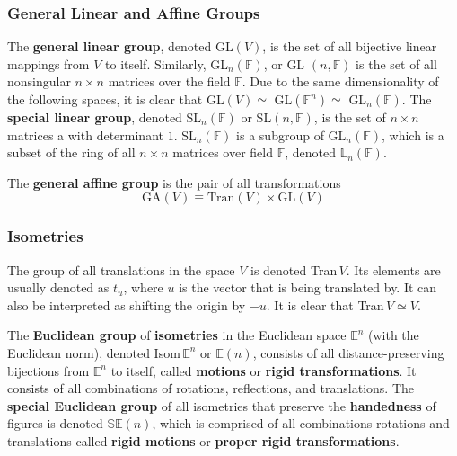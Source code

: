   \subsubsection{General Linear and Affine Groups}

    \begin{definition}
      The \textbf{general linear group}, denoted GL$(V)$, is the set of all bijective linear mappings from $V$ to itself. Similarly, GL$_{n}(\mathbb{F})$, or GL $(n, \mathbb{F})$ is the set of all nonsingular $n \times n$ matrices over the field $\mathbb{F}$. Due to the same dimensionality of the following spaces, it is clear that GL$(V) \simeq$ GL$(\mathbb{F}^{n}) \simeq$ GL$_{n}(\mathbb{F})$. The \textbf{special linear group}, denoted SL$_{n} (\mathbb{F})$ or SL$(n, \mathbb{F})$, is the set of $n\times n$ matrices a with determinant $1$. SL$_{n}(\mathbb{F})$ is a subgroup of GL$_{n}(\mathbb{F})$, which is a subset of the ring of all $n \times n$ matrices over field $\mathbb{F}$, denoted $\mathbb{L}_{n}(\mathbb{F})$. 
    \end{definition}

    \begin{definition}
      The \textbf{general affine group} is the pair of all transformations
      \begin{equation}
        \text{GA} (V) \equiv \text{Tran}(V) \times \text{GL}(V)
      \end{equation}
    \end{definition}

  \subsubsection{Isometries}

    \begin{definition}
      The group of all translations in the space $V$ is denoted Tran$\,V$. Its elements are usually denoted as $t_{u}$, where $u$ is the vector that is being translated by. It can also be interpreted as shifting the origin by $-u$. It is clear that Tran$\,V \simeq V$. 
    \end{definition}

    \begin{definition}
      The \textbf{Euclidean group} of \textbf{isometries} in the Euclidean space $\mathbb{E}^{n}$ (with the Euclidean norm), denoted Isom$\, \mathbb{E}^{n}$ or $\mathbb{E}(n)$, consists of all distance-preserving bijections from $\mathbb{E}^{n}$ to itself, called \textbf{motions} or \textbf{rigid transformations}. It consists of all combinations of rotations, reflections, and translations. The \textbf{special Euclidean group} of all isometries that preserve the \textbf{handedness} of figures is denoted $\mathbb{SE}(n)$, which is comprised of all combinations rotations and translations called \textbf{rigid motions} or \textbf{proper rigid transformations}.
    \end{definition}

